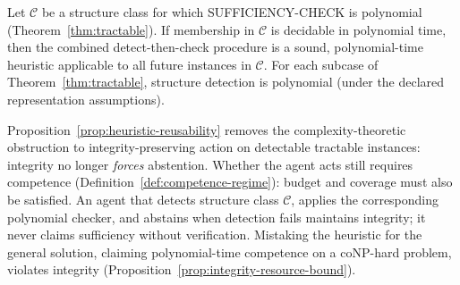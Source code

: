 \begin{proposition}\label{prop:heuristic-reusability}
Let $\mathcal{C}$ be a structure class for which SUFFICIENCY-CHECK is polynomial (Theorem~\ref{thm:tractable}). If membership in $\mathcal{C}$ is decidable in polynomial time, then the combined detect-then-check procedure is a sound, polynomial-time heuristic applicable to all future instances in $\mathcal{C}$.
For each subcase of Theorem~\ref{thm:tractable}, structure detection is polynomial (under the declared representation assumptions).
\end{proposition}

\begin{remark}
Proposition~\ref{prop:heuristic-reusability} removes the complexity-theoretic obstruction to integrity-preserving action on detectable tractable instances: integrity no longer \emph{forces} abstention. Whether the agent acts still requires competence (Definition~\ref{def:competence-regime}): budget and coverage must also be satisfied. An agent that detects structure class $\mathcal{C}$, applies the corresponding polynomial checker, and abstains when detection fails maintains integrity; it never claims sufficiency without verification. Mistaking the heuristic for the general solution, claiming polynomial-time competence on a coNP-hard problem, violates integrity (Proposition~\ref{prop:integrity-resource-bound}).
\end{remark}
